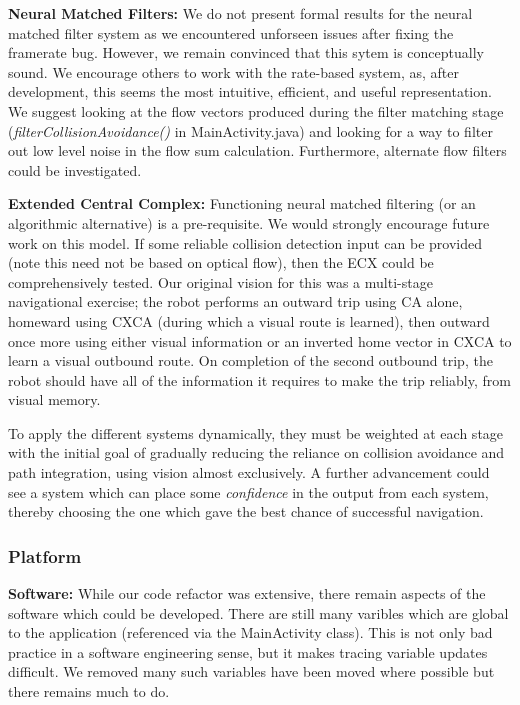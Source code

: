 \documentclass[a4paper,11pt,twoside,openright]{article}
\begin{document}
\textbf{Neural Matched Filters:} We do not present formal results
for the neural matched filter system as we encountered unforseen
issues after fixing the framerate bug. However, we remain convinced
that this sytem is conceptually sound. We encourage others to
work with the rate-based system, as, after development, this seems the
most intuitive, efficient, and useful representation. We
suggest looking at the flow vectors produced during the filter
matching stage (\textit{filterCollisionAvoidance()} in
MainActivity.java) and looking for a way to filter out low level
noise in the flow sum calculation. Furthermore, alternate flow filters
could be investigated.
\newline\par

\textbf{Extended Central Complex:} Functioning neural matched
filtering (or an algorithmic alternative) is a pre-requisite.
We would strongly encourage future work on this model. If some
reliable collision detection input can be provided (note this need not
be based on optical flow), then the ECX could be comprehensively
tested. Our original vision for this was a multi-stage navigational
exercise; the robot performs an outward trip using CA alone, homeward
using CXCA (during which a visual route is learned), then outward once
more using either visual information or an inverted home vector in
CXCA to learn a visual outbound route. On completion of the second
outbound trip, the robot should have all of the information it
requires to make the trip reliably, from visual memory. \newline\par

To apply the different systems dynamically, they must be weighted at
each stage with the initial goal of gradually reducing the reliance on
collision avoidance and path integration, using vision almost
exclusively. A further advancement could see a system which can place
some \textit{confidence} in the output from each system, thereby
choosing the one which gave the best chance of successful navigation.
\newline\par

\subsubsection{Platform}\label{sec:disc:platform}
\textbf{Software:} While our code refactor was extensive, there remain
aspects of the software which could be developed. There are still
many varibles which are global to the application (referenced via the
MainActivity class). This is not only bad practice in a software
engineering sense, but it makes tracing variable updates
difficult. We removed many such variables have been moved where possible but
there remains much to do.\newline\par
\end{document}

